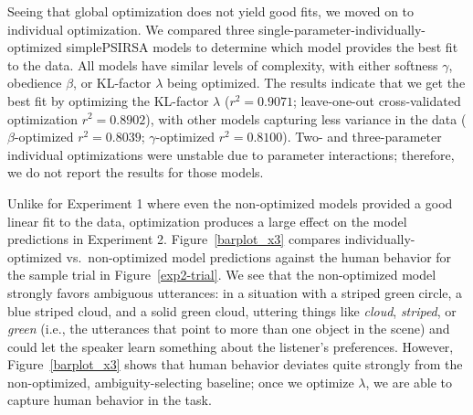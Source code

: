 \documentclass[10pt,a4paper]{article}
\begin{document}


Seeing that global optimization does not yield good fits, we moved on to individual optimization. 
We compared three single-parameter-individually-optimized simplePSIRSA models to determine which model provides the best fit to the data. 
All models have similar levels of complexity, with either softness $\gamma$, obedience $\beta$, or KL-factor $\lambda$ being optimized.
The results indicate that we get the best fit by optimizing the KL-factor $\lambda$ ($r^{2}=0.9071$; leave-one-out cross-validated optimization $r^{2}=0.8902$), with other models capturing less variance in the data ($\beta$-optimized $r^{2}=0.8039$; $\gamma$-optimized $r^{2}=0.8100$).
Two- and three-parameter individual optimizations were unstable due to parameter interactions; therefore, we do not report the results for those models.

Unlike for Experiment 1 where even the non-optimized models provided a good linear fit to the data, optimization produces a large effect on the model predictions in Experiment 2. Figure~\ref{barplot_x3} compares individually-optimized vs.~non-optimized model predictions against the human behavior for the sample trial in Figure~\ref{exp2-trial}. We see that the non-optimized model strongly favors ambiguous utterances: in a situation with a striped green circle, a blue striped cloud, and a solid green cloud, uttering things like \textit{cloud}, \textit{striped}, or \textit{green} (i.e., the utterances that point to more than one object in the scene) and could let the speaker learn something about the listener's preferences. However, Figure~\ref{barplot_x3} shows that human behavior deviates quite strongly from the non-optimized, ambiguity-selecting baseline; once we optimize $\lambda$, we are able to capture human behavior in the task.
\end{document}
